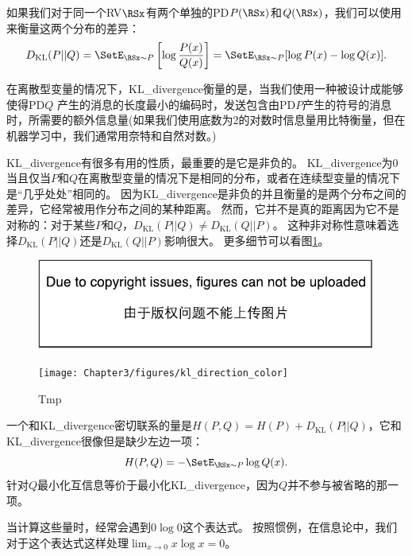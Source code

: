 
如果我们对于同一个\gls{RV}$\RSx$有两个单独的\gls{PD}$P(\RSx)$和$Q(\RSx)$，我们可以使用来衡量这两个分布的差异：
\begin{equation}
D_{\text{KL}}(P||Q) = \SetE_{\RSx \sim P} \left [  \log \frac{P(x)}{Q(x)} \right ] = \SetE_{\RSx \sim P} [\log P(x) - \log Q(x)].
\end{equation}

在离散型变量的情况下，\gls{KL_divergence}衡量的是，当我们使用一种被设计成能够使得\gls{PD}$Q$ 产生的消息的长度最小的编码时，发送包含由\gls{PD}$P$产生的符号的消息时，所需要的额外信息量(如果我们使用底数为2的对数时信息量用比特衡量，但在机器学习中，我们通常用奈特和自然对数。)

\gls{KL_divergence}有很多有用的性质，最重要的是它是非负的。
\gls{KL_divergence}为0当且仅当$P$和$Q$在离散型变量的情况下是相同的分布，或者在连续型变量的情况下是``几乎处处''相同的。
因为\gls{KL_divergence}是非负的并且衡量的是两个分布之间的差异，它经常被用作分布之间的某种距离。
然而，它并不是真的距离因为它不是对称的：对于某些$P$和$Q$，$D_\text{KL}(P||Q) \ne D_\text{KL}(Q||P)$。
这种非对称性意味着选择$D_\text{KL}(P||Q)$还是$D_\text{KL}(Q||P)$影响很大。
更多细节可以看图\ref{fig:chap3_kl_direction_color}。
\begin{figure}[!htb]
\ifOpenSource
\centerline{\includegraphics{figure.pdf}}
\else
\centerline{\texttt{[image: Chapter3/figures/kl\_direction\_color]}}
\fi
\caption{Tmp}
\label{fig:chap3_kl_direction_color}
\end{figure}



一个和\gls{KL_divergence}密切联系的量是$H(P, Q) = H(P) + D_\text{KL}(P||Q)$，它和\gls{KL_divergence}很像但是缺少左边一项：
\begin{equation}
H(P, Q) = -\SetE_{\RSx\sim P} \log Q(x).
\end{equation}
针对$Q$最小化互信息等价于最小化\gls{KL_divergence}，因为$Q$并不参与被省略的那一项。

当计算这些量时，经常会遇到$0\log 0$这个表达式。
按照惯例，在信息论中，我们对于这个表达式这样处理$\lim_{x \to 0} x\log x = 0$。

